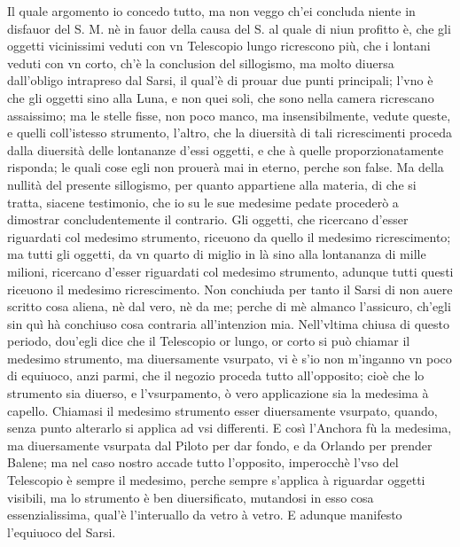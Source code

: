 \documentclass[11pt,twoside,openany]{book}
\begin{document}
Il quale argomento io concedo tutto, ma non veggo ch'ei concluda niente in disfauor del S. M. nè in fauor della causa del S. al quale di niun profitto è, che gli oggetti vicinissimi veduti con vn Telescopio lungo ricrescono più, che i lontani veduti con vn corto, ch'è la conclusion del sillogismo, ma molto diuersa dall'obligo intrapreso dal Sarsi, il qual'è di prouar due punti principali; l'vno è che gli oggetti sino alla Luna, e non quei soli, che sono nella camera ricrescano assaissimo; ma le stelle fisse, non poco manco, ma insensibilmente, vedute queste, e quelli coll'istesso strumento, l'altro, che la diuersità di tali ricrescimenti proceda dalla diuersità delle lontananze d'essi oggetti, e che à quelle proporzionatamente risponda; le quali cose egli non prouerà mai in eterno, perche son false. Ma della nullità del presente sillogismo, per quanto appartiene alla materia, di che si tratta, siacene testimonio, che io su le sue medesime pedate procederò a dimostrar concludentemente il contrario. Gli oggetti, che ricercano d'esser riguardati col medesimo strumento, riceuono da quello il medesimo ricrescimento; ma tutti gli oggetti, da vn quarto di miglio in là sino alla lontananza di mille milioni, ricercano d'esser riguardati col medesimo strumento, adunque tutti questi riceuono il medesimo ricrescimento. Non conchiuda per tanto il Sarsi di non auere scritto cosa aliena, nè dal vero, nè da me; perche di mè almanco l'assicuro, ch'egli sin quì hà conchiuso cosa contraria all'intenzion mia. Nell'vltima chiusa di questo periodo, dou'egli dice che il Telescopio or lungo, or corto si può chiamar il medesimo strumento, ma diuersamente vsurpato, vi è s'io non m'inganno vn poco di equiuoco, anzi parmi, che il negozio proceda tutto all'opposito; cioè che lo strumento sia diuerso, e l'vsurpamento, ò vero applicazione sia la medesima à capello. Chiamasi il medesimo strumento esser diuersamente vsurpato, quando, senza punto alterarlo si applica ad vsi differenti. E così l'Anchora fù la medesima, ma diuersamente vsurpata dal Piloto per dar fondo, e da Orlando per prender Balene; ma nel caso nostro accade tutto l'opposito, imperocchè l'vso del Telescopio è sempre il medesimo, perche sempre s'applica à riguardar oggetti visibili, ma lo strumento è ben diuersificato, mutandosi in esso cosa essenzialissima, qual'è l'interuallo da vetro à vetro. E adunque manifesto l'equiuoco del Sarsi.
\end{document}
